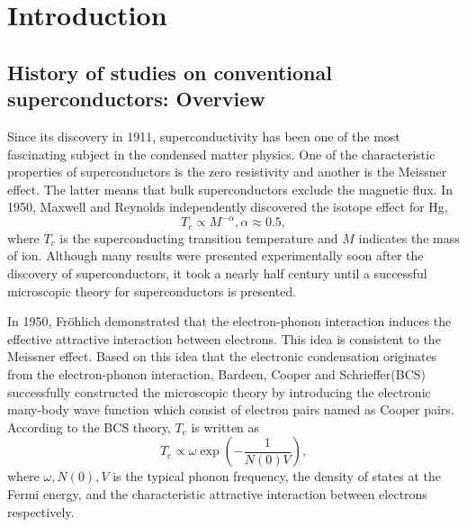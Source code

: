 

%
%
\chapter{Introduction}



\section{History of studies on conventional superconductors: Overview}
Since its discovery in 1911\cite{Onnes1911}, superconductivity has been one of the most fascinating
subject in the condensed matter physics. One of the characteristic properties of superconductors is
the zero resistivity and another is the Meissner effect\cite{Meissner1933}.
The latter means that bulk superconductors exclude the magnetic flux.
In 1950, Maxwell\cite{Maxwell1950} and Reynolds\cite{Reynolds1950} independently discovered the 
isotope effect for Hg,
%
\begin{equation}
	T_{c} \propto M^{-\alpha}, \alpha \approx 0.5,
	\label{eq:isotope}
\end{equation}
%
where $T_c$ is the superconducting transition temperature and $M$ indicates the mass of ion.
Although many results were presented experimentally soon after the discovery of superconductors,
it took a nearly half century until a successful microscopic theory for superconductors is presented.

In 1950, Fr\"{o}hlich\cite{Froehlich1950} demonstrated that the electron-phonon interaction induces the
effective attractive interaction between electrons. This idea is consistent to the Meissner effect.
Based on this idea that the electronic condensation originates from the electron-phonon interaction, 
Bardeen, Cooper and Schrieffer(BCS)\cite{BCS1957} successfully constructed the microscopic 
theory by introducing the electronic many-body wave function which consist of electron pairs named as
Cooper pairs\cite{Cooper1956}. According to the BCS theory, $T_c$ is written as
%
\begin{equation}
	T_{c} \propto \omega\exp \left( -\frac{1}{N(0)V} \right),
	\label{eq:TcBCS}
\end{equation}
%
where $\omega, N(0), V$ is the typical phonon frequency, the density of states at the Fermi energy, 
and the characteristic attractive interaction between electrons respectively.

